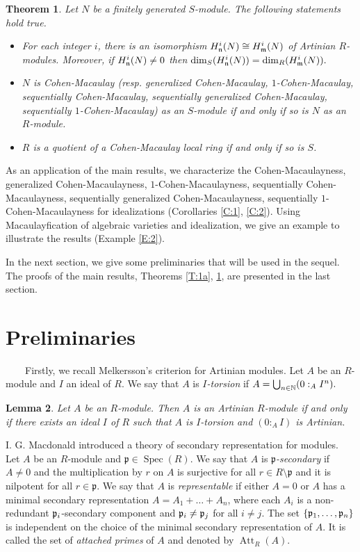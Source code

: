 \documentclass[a4papersize]{article}
\newtheorem{theorem}{Theorem}[section]
\newtheorem{lemma}[theorem]{Lemma}
\DeclareMathOperator{\Att}{Att}
\DeclareMathOperator{\Spec}{Spec}
\begin{document}
{\begin{theorem}\label{T:2a} Let $N$ be a finitely generated $S$-module. The following statements hold true. 
\begin{itemize}			
\item [{\rm (a)}] For each integer $i$, there is an isomorphism $H^i_{\frak n}(N)\cong  H^i_{\frak m}(N)$ of Artinian $R$-modules. Moreover, if $H^i_{\frak n}(N)\neq 0$ then  
$\dim_S(H^i_{\frak n}(N))=\dim_R(H^i_{\frak m}(N)).$
\item [{\rm (b)}] $N$ is Cohen-Macaulay (resp. generalized Cohen-Macaulay, $1$-Cohen-Macaulay,  sequentially  Cohen-Macaulay, sequentially  generalized Cohen-Macaulay, sequentially  $1$-Cohen-Macaulay)  as an $S$-module if and only if so is $N$ as an $R$-module.
\item [{\rm (c)}]  $R$ is a quotient of a Cohen-Macaulay local ring if and only if so is  $S$.
\end{itemize} 		
\end{theorem}

As an application of the main results, we  characterize the Cohen-Macaulayness, generalized Cohen-Macaulayness, $1$-Cohen-Macaulayness, sequentially Cohen-Macaulayness,  sequentially generalized  Cohen-Macaulayness, sequentially $1$-Cohen-Macaulayness for idealizations (Corollaries \ref{C:1}, \ref{C:2}). Using Macaulayfication of  algebraic varieties and idealization, we give an example to illustrate the results (Example \ref{E:2}).
 
 In the next section, we give some preliminaries that will be used in the sequel. The proofs of the main results, Theorems \ref{T:1a}, \ref{T:2a}, are presented in the last section.   

\section{ Preliminaries}	
		
\ \ \ \  Firstly, we recall Melkersson's criterion \cite[Theorem 1.3]{Me} for Artinian modules. Let $A$ be an $R$-module and $I$ an ideal of $R$. We say that $A$ is {\it $I$-torsion} if $A=\bigcup_{n\in\Bbb N}(0:_AI^n).$
\begin{lemma}\label{L:1}
	Let $A$ be an $R$-module. Then $A$ is an Artinian $R$-module if and only if there exists an ideal $I$ of $R$ such that $A$ is $I$-torsion and $(0:_AI)$ is Artinian.   
\end{lemma}

I. G. Macdonald \cite{Mac} introduced a theory of secondary representation for modules.  Let $A$ be an $R$-module and $\mathfrak p\in\Spec(R)$. We say that $A$ is {\it $\mathfrak p$-secondary} if $A\neq 0$ and the multiplication by $r$ on $A$ is  surjective for all $r\in R\setminus \mathfrak p$ and  it is nilpotent for all $r\in\mathfrak p$. We say that $A$ is {\it representable} if either $A=0$ or $A$ has a minimal secondary representation $A=A_1+\ldots+A_n$, where each $A_i$ is a non-redundant $\frak p_i$-secondary component and $\frak p_i\ne\frak p_j$ for all $i\ne j.$ The set $\{\frak p_1,\ldots,\frak p_n\}$ is independent on the choice of the minimal secondary representation of $A$. It is called the set of {\it attached primes} of $A$ and denoted by $\Att_R(A).$ 
	
}
\end{document}
